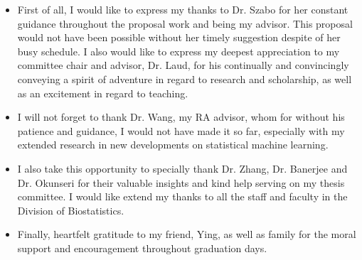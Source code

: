 \documentclass[hyperref={bookmarks=false},aspectratio=169]{beamer}
\begin{document}
\begin{frame}
     \begin{itemize}
     \item First of all, I would like to express my thanks to Dr. Szabo for her constant guidance throughout the proposal work and being my advisor. This proposal would not have been possible without her timely suggestion despite of her busy schedule. I also would like to express my deepest appreciation to my committee chair and advisor, Dr. Laud, for his continually and convincingly conveying a spirit of adventure in regard to research and scholarship, as well as an excitement in regard to teaching.
     \item  I will not forget to thank Dr. Wang, my RA advisor, whom for without his patience and guidance, I would not have made it so far, especially with my extended research in new developments on statistical machine learning.
     \item I also take this opportunity to specially thank Dr. Zhang, Dr. Banerjee and Dr. Okunseri for their valuable insights and kind help serving on my thesis committee. I would like extend my thanks to all the staff and faculty in the Division of Biostatistics.
     \item Finally, heartfelt gratitude to my friend, Ying, as well as family for the moral support and encouragement throughout graduation days.
     \end{itemize}
 \end{frame}
\end{document}
